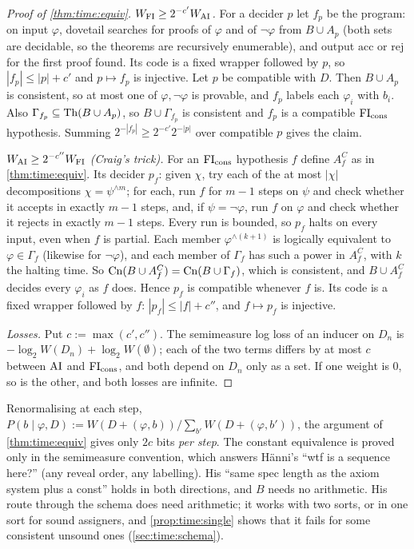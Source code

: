 \begin{proof}[Proof of \cref{thm:time:equiv}]
\emph{$W_{\mathrm{FI}}\ge2^{-c'}W_{\mathrm{AI}}$.} For a decider $p$ let $f_p$ be the program: on input $\varphi$, dovetail searches for proofs of $\varphi$ and of $\neg\varphi$ from $B\cup A_p$ (both sets are decidable, so the theorems are recursively enumerable), and output $\mathrm{acc}$ or $\mathrm{rej}$ for the first proof found. Its code is a fixed wrapper followed by $p$, so $|f_p|\le|p|+c'$ and $p\mapsto f_p$ is injective. Let $p$ be compatible with $D$. Then $B\cup A_p$ is consistent, so at most one of $\varphi,\neg\varphi$ is provable, and $f_p$ labels each $\varphi_i$ with $b_i$. Also $\Gamma_{f_p}\subseteq\mathrm{Th}(B\cup A_p)$, so $B\cup\Gamma_{f_p}$ is consistent and $f_p$ is a compatible $\mathrm{FI}_{\mathrm{cons}}$ hypothesis. Summing $2^{-|f_p|}\ge2^{-c'}2^{-|p|}$ over compatible $p$ gives the claim.

\emph{$W_{\mathrm{AI}}\ge2^{-c''}W_{\mathrm{FI}}$ (Craig's trick).} For an $\mathrm{FI}_{\mathrm{cons}}$ hypothesis $f$ define $A^C_f$ as in \cref{thm:time:equiv}. Its decider $p_f$: given $\chi$, try each of the at most $|\chi|$ decompositions $\chi=\psi^{\wedge m}$; for each, run $f$ for $m-1$ steps on $\psi$ and check whether it accepts in exactly $m-1$ steps, and, if $\psi=\neg\varphi$, run $f$ on $\varphi$ and check whether it rejects in exactly $m-1$ steps. Every run is bounded, so $p_f$ halts on every input, even when $f$ is partial. Each member $\varphi^{\wedge(k+1)}$ is logically equivalent to $\varphi\in\Gamma_f$ (likewise for $\neg\varphi$), and each member of $\Gamma_f$ has such a power in $A^C_f$, with $k$ the halting time. So $\mathrm{Cn}(B\cup A^C_f)=\mathrm{Cn}(B\cup\Gamma_f)$, which is consistent, and $B\cup A^C_f$ decides every $\varphi_i$ as $f$ does. Hence $p_f$ is compatible whenever $f$ is. Its code is a fixed wrapper followed by $f$: $|p_f|\le|f|+c''$, and $f\mapsto p_f$ is injective.

\emph{Losses.} Put $c:=\max(c',c'')$. The semimeasure log loss of an inducer on $D_n$ is $-\log_2W(D_n)+\log_2W(\emptyset)$; each of the two terms differs by at most $c$ between $\mathrm{AI}$ and $\mathrm{FI}_{\mathrm{cons}}$, and both depend on $D_n$ only as a set. If one weight is $0$, so is the other, and both losses are infinite.
\end{proof}

\begin{remark}\label{rem:time:convention}
Renormalising at each step, $P(b\mid\varphi,D):=W(D+(\varphi,b))/\sum_{b'}W(D+(\varphi,b'))$, the argument of \cref{thm:time:equiv} gives only $2c$ bits \emph{per step}. The constant equivalence is proved only in the semimeasure convention, which answers H\"anni's ``wtf is a sequence here?'' (any reveal order, any labelling). His ``same spec length as the axiom system plus a const'' holds in both directions, and $B$ needs no arithmetic. His route through the schema does need arithmetic; it works with two sorts, or in one sort for sound assigners, and \cref{prop:time:single} shows that it fails for some consistent unsound ones (\cref{sec:time:schema}).
\end{remark}

